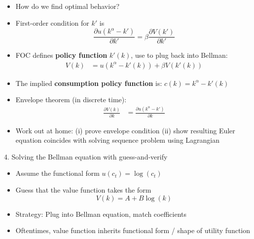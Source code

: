 \documentclass[10pt]{beamer}
\begin{document}
\begin{frame}{}
\begin{itemize}
\item How do we find optimal behavior? 

\item First-order condition for $k'$ is
\begin{equation*}
	\frac{\partial u(k^\alpha - k')}{\partial k'} = \beta \frac{\partial V(k')}{\partial k'}
\end{equation*}

\item FOC defines \textbf{policy function} $k'(k)$, use to plug back into Bellman:
\begin{align*}
	V(k) &= u(k^\alpha  - k'(k)) + \beta V(k'(k))
\end{align*}

\item The implied \textbf{consumption policy function} is: $c(k) = k^\alpha - k'(k)$

\item Envelope theorem (in discrete time):
\begin{align*}
	\frac{\partial V(k)}{\partial k} &= \frac{\partial u(k^\alpha - k')}{\partial k}
\end{align*}

\item Work out at home: (i) prove envelope condition (ii) show resulting Euler equation coincides with solving sequence problem using Lagrangian
\end{itemize}
\end{frame}



\begin{frame}{4. Solving the Bellman equation with guess-and-verify}
\begin{itemize}
\item Assume the functional form $u(c_t) = \log(c_t)$ 

\item Guess that the value function takes the form 
\begin{equation*}
	V(k) = A + B \log(k)
\end{equation*}

\item Strategy: Plug into Bellman equation, match coefficients

\item Oftentimes, value function inherits functional form / shape of utility function
\end{itemize}
\end{frame}
\end{document}
